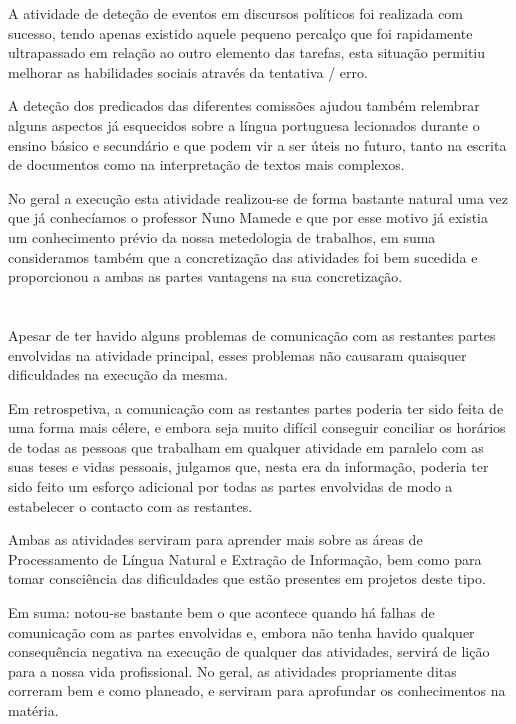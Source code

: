 \documentclass[a4paper,12pt,journal,twoside,compsoc]{PPIEEEtran}
\begin{document}
A atividade de deteção de eventos em discursos políticos foi realizada com sucesso, tendo apenas existido aquele pequeno percalço que foi rapidamente ultrapassado em relação ao outro elemento das tarefas, esta situação permitiu melhorar as habilidades sociais através da tentativa / erro. 

A deteção dos predicados das diferentes comissões ajudou também relembrar alguns aspectos já esquecidos sobre a língua portuguesa lecionados durante o ensino básico e secundário e que podem vir a ser úteis no futuro, tanto na escrita de documentos como na interpretação de textos mais complexos. 

No geral a execução esta atividade realizou-se de forma bastante natural uma vez que já conhecíamos o professor Nuno Mamede e que por esse motivo já existia um conhecimento prévio da nossa metedologia de trabalhos, em suma consideramos também que a concretização das atividades foi bem sucedida e proporcionou a ambas as partes vantagens na sua concretização.

\section{}
\label{conclusion}

Apesar de ter havido alguns problemas de comunicação com as restantes partes envolvidas na atividade principal, esses problemas não causaram quaisquer dificuldades na execução da mesma. 

Em retrospetiva, a comunicação com as restantes partes poderia ter sido feita de uma forma mais célere, e embora seja muito difícil conseguir conciliar os horários de todas as pessoas que trabalham em qualquer atividade em paralelo com as suas teses e vidas pessoais, julgamos que, nesta era da informação, poderia ter sido feito um esforço adicional por todas as partes envolvidas de modo a estabelecer o contacto com as restantes.

Ambas as atividades serviram para aprender mais sobre as áreas de Processamento de Língua Natural e Extração de Informação, bem como para tomar consciência das dificuldades que estão presentes em projetos deste tipo.

Em suma: notou-se bastante bem o que acontece quando há falhas de comunicação com as partes envolvidas e, embora não tenha havido qualquer consequência negativa na execução de qualquer das atividades, servirá de lição para a nossa vida profissional. No geral, as atividades propriamente ditas correram bem e como planeado, e serviram para aprofundar os conhecimentos na matéria.
\end{document}
